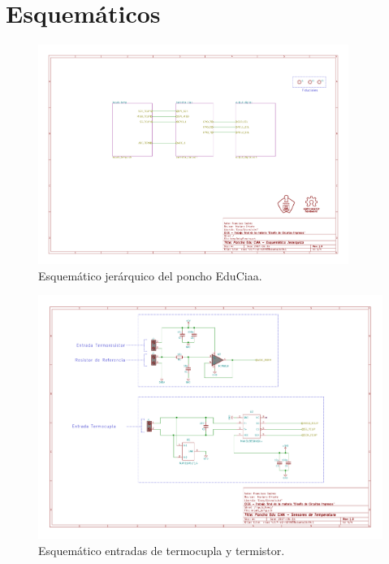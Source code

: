 
\chapter{Esquemáticos} %
\label{AppendixB} %

\begin{figure}
	\centering
	\includegraphics[width=0.9\textwidth]{Figures/Appendices/sch_mainPoncho}
	\caption{Esquemático jerárquico del poncho EduCiaa.}
	\label{fig:schMainPoncho}
\end{figure}


\begin{figure}
	\centering
	\includegraphics[width=1\textwidth]{Figures/Appendices/sch_inpTempTerm}
	\caption{Esquemático entradas de termocupla y termistor.}
	\label{fig:schEntradas}
\end{figure}


